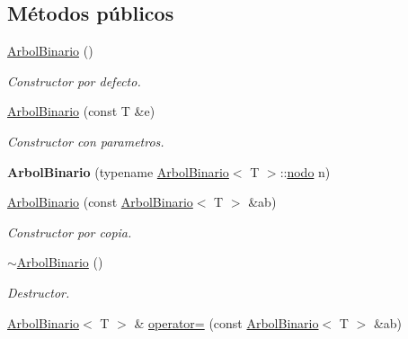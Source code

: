 \subsection*{Métodos públicos}
\begin{DoxyCompactItemize}
\item 
\mbox{\label{classArbolBinario_a1bad900ff9a1a811446c5e729e92fc5e}} 
\hyperlink{classArbolBinario_a1bad900ff9a1a811446c5e729e92fc5e}{Arbol\+Binario} ()
\begin{DoxyCompactList}\small\item\em Constructor por defecto. \end{DoxyCompactList}\item 
\mbox{\label{classArbolBinario_a9d4e385399072873beb86170628449bb}} 
\hyperlink{classArbolBinario_a9d4e385399072873beb86170628449bb}{Arbol\+Binario} (const T \&e)
\begin{DoxyCompactList}\small\item\em Constructor con parametros. \end{DoxyCompactList}\item 
\mbox{\label{classArbolBinario_a9f2da510e19bff23fd061ff0f1309433}} 
{\bfseries Arbol\+Binario} (typename \hyperlink{classArbolBinario}{Arbol\+Binario}$<$ T $>$\+::\hyperlink{classArbolBinario_1_1nodo}{nodo} n)
\item 
\mbox{\label{classArbolBinario_a3be887e389952b296ea5af62852621d5}} 
\hyperlink{classArbolBinario_a3be887e389952b296ea5af62852621d5}{Arbol\+Binario} (const \hyperlink{classArbolBinario}{Arbol\+Binario}$<$ T $>$ \&ab)
\begin{DoxyCompactList}\small\item\em Constructor por copia. \end{DoxyCompactList}\item 
\mbox{\label{classArbolBinario_af1f1594a37b45c20b4fcbab88613d52d}} 
\hyperlink{classArbolBinario_af1f1594a37b45c20b4fcbab88613d52d}{$\sim$\+Arbol\+Binario} ()
\begin{DoxyCompactList}\small\item\em Destructor. \end{DoxyCompactList}\item 
\hyperlink{classArbolBinario}{Arbol\+Binario}$<$ T $>$ \& \hyperlink{classArbolBinario_a3817bd260b6cb4687eef91928d94be17}{operator=} (const \hyperlink{classArbolBinario}{Arbol\+Binario}$<$ T $>$ \&ab)

\end{DoxyCompactItemize}
